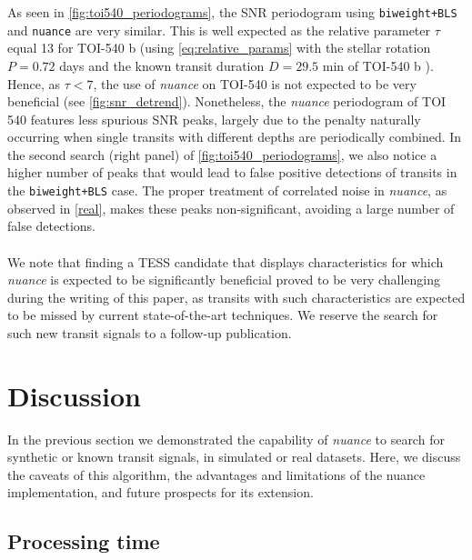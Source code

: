 \documentclass[modern]{aastex631}
\newcommand{\nuancemethod}{\textit{nuance}}
\newcommand{\nuance}{\nuancemethod{}}
\newcommand{\nuancecode}{\textsf{nuance}}
\begin{document}
As seen in \autoref{fig:toi540_periodograms}, the SNR periodogram using \texttt{biweight+BLS} and \texttt{nuance} are very similar. This is well expected as the relative parameter $\tau$ equal 13 for TOI-540 b (using \autoref{eq:relative_params} with the stellar rotation $P=0.72$ days and the known transit duration $D=29.5$ min of TOI-540 b \citep{TOI540}). Hence, as $\tau < 7$, the use of \nuance{} on TOI-540 is not expected to be very beneficial (see \autoref{fig:snr_detrend}). Nonetheless, the \nuance{} periodogram of TOI 540 features less spurious SNR peaks, largely due to the penalty naturally occurring when single transits with different depths are periodically combined. In the second search (right panel) of \autoref{fig:toi540_periodograms}, we also notice a higher number of peaks that would lead to false positive detections of transits in the \texttt{biweight+BLS} case. The proper treatment of correlated noise in \nuance{}, as observed in \autoref{real}, makes these peaks non-significant, avoiding a large number of false detections.\\\\
We note that finding a TESS candidate that displays characteristics for which \nuance{} is expected to be significantly beneficial proved to be very challenging during the writing of this paper, as transits with such characteristics are expected to be missed by current state-of-the-art techniques. We reserve the search for such new transit signals to a follow-up publication.

\section{Discussion}\label{discussion}

In the previous section we demonstrated the capability of \nuance{} to search for synthetic or known transit signals, in simulated or real datasets. Here, we discuss the caveats of this algorithm, the advantages and limitations of the \nuancecode{} implementation, and future prospects for its extension.

\subsection{Processing time}
\end{document}
